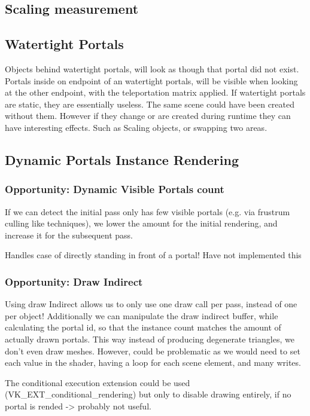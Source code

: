 \subsection{Scaling measurement}

\subsection{Watertight Portals}
Objects behind watertight portals, will look as though that portal did not exist. Portals inside on endpoint of an watertight portals, will be visible when looking at the other endpoint, with the teleportation matrix applied. If watertight portals are static, they are essentially useless. The same scene could have been created without them.
However if they change or are created during runtime they can have interesting effects. Such as Scaling objects, or swapping two areas.

\subsection{Dynamic Portals Instance Rendering}

\subsubsection{Opportunity: Dynamic Visible Portals count}
If we can detect the initial pass only has few visible portals (e.g. via frustrum culling like techniques), we lower the amount for the initial rendering, and increase it for
the subsequent pass.

Handles case of directly standing in front of a portal!
Have not implemented this

\subsubsection{Opportunity: Draw Indirect}
Using draw Indirect allows us to only use one draw call per pass, instead of one per object!
Additionally we can manipulate the draw indirect buffer, while calculating the portal id, so that the instance count matches the amount of actually drawn portals.
This way instead of producing degenerate triangles, we don't even draw meshes.
However, could be problematic as we would need to set each value in the shader, having a loop for each scene element, and many writes.

The conditional execution extension could be used (VK\_EXT\_conditional\_rendering) but only to disable drawing entirely, if no portal is rended -> probably not useful.

